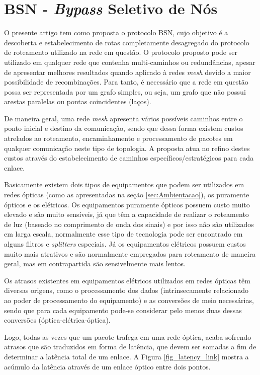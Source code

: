 \documentclass[12pt]{article}
\begin{document}
\section{BSN - \emph{Bypass} Seletivo de Nós}
\label{sec:proposta}
O presente artigo tem como proposta o protocolo BSN, cujo objetivo é a descoberta e estabelecimento de rotas completamente desagregado do protocolo de roteamento utilizado na rede em questão. O protocolo proposto pode ser utilizado em qualquer rede que contenha multi-caminhos ou redundâncias, apesar de apresentar melhores resultados quando aplicado à redes \emph{mesh} devido a maior possibilidade de recombinações. Para tanto, é necessário que a rede em questão possa ser representada por um grafo simples, ou seja, um grafo que não possui arestas paralelas ou pontas coincidentes (laços).

De maneira geral, uma rede \emph{mesh} apresenta vários possíveis caminhos entre o ponto inicial e destino da comunicação, sendo que dessa forma existem custos atrelados ao roteamento, encaminhamento e processamento de pacotes em qualquer comunicação neste tipo de topologia. A proposta atua no refino destes custos através do estabelecimento de caminhos específicos/estratégicos para cada enlace.

Basicamente existem dois tipos de equipamentos que podem ser utilizados em redes ópticas (como as apresentadas na seção \ref{sec:Ambientacao}), os puramente ópticos e os elétricos. Os equipamentos puramente ópticos possuem custo muito elevado e são muito sensíveis, já que têm a capacidade de realizar o roteamento de luz (baseado no comprimento de onda dos sinais) e por isso não são utilizados em larga escala, normalmente esse tipo de tecnologia pode ser encontrado em alguns filtros e \emph{splitters} especiais. Já os equipamentos elétricos possuem custos muito mais atrativos e são normalmente empregados para roteamento de maneira geral, mas em contrapartida são sensivelmente mais lentos.

Os atrasos existentes em equipamentos elétricos utilizados em redes ópticas têm diversas origens, como o processamento dos dados (intrinsecamente relacionado ao poder de processamento do equipamento) e as conversões de meio necessárias, sendo que para cada equipamento pode-se considerar pelo menos duas dessas conversões (óptica-elétrica-óptica). 

Logo, todas as vezes que um pacote trafega em uma rede óptica, acaba sofrendo atrasos que são traduzidos em forma de latência, que devem ser somadas a fim de determinar a latência total de um enlace. A Figura \ref{fig_latency_link} mostra a acúmulo da latência através de um enlace óptico entre dois pontos. 
\end{document}
